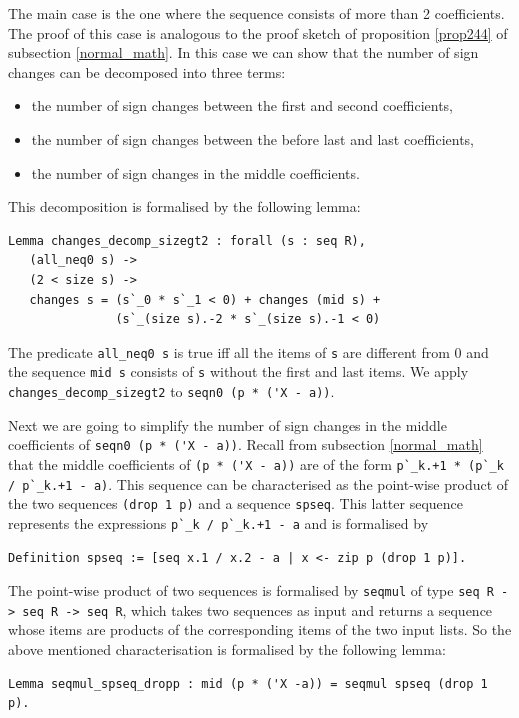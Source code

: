 \documentclass[11pt, a4paper]{article}
\begin{document}
The main case is the one where the sequence consists of more than 2 coefficients. The proof of this case is analogous to the proof sketch of proposition \ref{prop244} of subsection \ref{normal_math}. In this case we can show that the number of sign changes can be decomposed into three terms:
\begin{itemize}
 \item the number of sign changes between the first and second coefficients,
 \item the number of sign changes between the before last and last coefficients,
 \item the number of sign changes in the middle coefficients.
\end{itemize}
This decomposition is formalised by the following lemma:
\begin{lstlisting}
Lemma changes_decomp_sizegt2 : forall (s : seq R),
   (all_neq0 s) ->
   (2 < size s) ->
   changes s = (s`_0 * s`_1 < 0) + changes (mid s) +
               (s`_(size s).-2 * s`_(size s).-1 < 0)
\end{lstlisting}
The predicate \lstinline!all_neq0 s! is true iff all the items of \lstinline!s! are different from 0
and the sequence \lstinline!mid s! consists of \lstinline!s! without the first and last items.
We apply \lstinline!changes_decomp_sizegt2! to \lstinline!seqn0 (p * ('X - a))!.

Next we are going to simplify the number of sign changes in the middle coefficients of \lstinline!seqn0 (p * ('X - a))!.
 Recall from subsection \ref{normal_math} that the middle coefficients of \lstinline!(p * ('X - a))! are of the form \lstinline!p`_k.+1 * (p`_k / p`_k.+1 - a)!. This sequence can be characterised as the point-wise product of the two sequences \lstinline!(drop 1 p)! and a sequence \lstinline!spseq!. This latter sequence represents the expressions \lstinline!p`_k / p`_k.+1 - a! and is formalised by
\begin{lstlisting}
Definition spseq := [seq x.1 / x.2 - a | x <- zip p (drop 1 p)].
\end{lstlisting}
The point-wise product of two sequences is formalised by \lstinline!seqmul! of type \lstinline!seq R -> seq R -> seq R!, which takes two sequences as input and returns a sequence whose items are products of the corresponding items of the two input lists. So the above mentioned characterisation is formalised by the following lemma:
\begin{lstlisting}
Lemma seqmul_spseq_dropp : mid (p * ('X -a)) = seqmul spseq (drop 1 p).
\end{lstlisting} 
\end{document}
